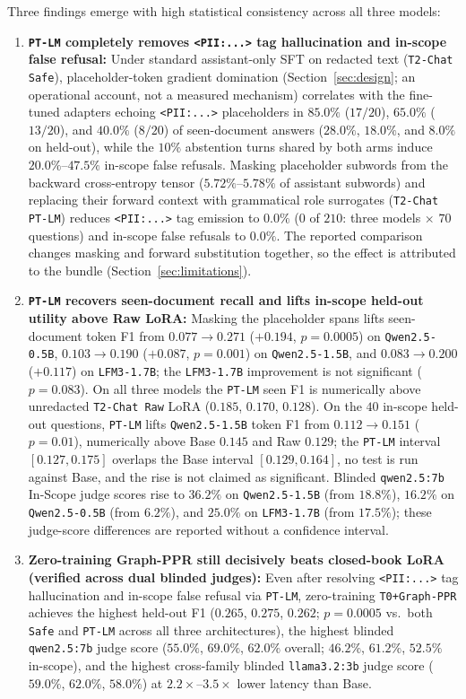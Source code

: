 \documentclass{article}
\begin{document}
Three findings emerge with high statistical consistency across all three models:
\begin{enumerate}
    \item \textbf{\texttt{PT-LM} completely removes \texttt{<PII:...>} tag hallucination and in-scope false refusal:} Under standard assistant-only SFT on redacted text (\texttt{T2-Chat Safe}), placeholder-token gradient domination (Section~\ref{sec:design}; an operational account, not a measured mechanism) correlates with the fine-tuned adapters echoing \texttt{<PII:...>} placeholders in $85.0\%$ ($17/20$), $65.0\%$ ($13/20$), and $40.0\%$ ($8/20$) of seen-document answers ($28.0\%$, $18.0\%$, and $8.0\%$ on held-out), while the $10\%$ abstention turns shared by both arms induce $20.0\%$--$47.5\%$ in-scope false refusals. Masking placeholder subwords from the backward cross-entropy tensor ($5.72\%$--$5.78\%$ of assistant subwords) and replacing their forward context with grammatical role surrogates (\texttt{T2-Chat PT-LM}) reduces \texttt{<PII:...>} tag emission to $\mathbf{0.0\%}$ ($0$ of $210$: three models $\times$ $70$ questions) and in-scope false refusals to $\mathbf{0.0\%}$. The reported comparison changes masking and forward substitution together, so the effect is attributed to the bundle (Section~\ref{sec:limitations}).
    \item \textbf{\texttt{PT-LM} recovers seen-document recall and lifts in-scope held-out utility above Raw LoRA:} Masking the placeholder spans lifts seen-document token F1 from $0.077 \to \mathbf{0.271}$ ($+0.194$, $p = 0.0005$) on \texttt{Qwen2.5-0.5B}, $0.103 \to \mathbf{0.190}$ ($+0.087$, $p = 0.001$) on \texttt{Qwen2.5-1.5B}, and $0.083 \to \mathbf{0.200}$ ($+0.117$) on \texttt{LFM3-1.7B}; the \texttt{LFM3-1.7B} improvement is not significant ($p = 0.083$). On all three models the \texttt{PT-LM} seen F1 is numerically above unredacted \texttt{T2-Chat Raw} LoRA ($0.185$, $0.170$, $0.128$). On the $40$ in-scope held-out questions, \texttt{PT-LM} lifts \texttt{Qwen2.5-1.5B} token F1 from $0.112 \to 0.151$ ($p = 0.01$), numerically above Base $0.145$ and Raw $0.129$; the \texttt{PT-LM} interval $[0.127, 0.175]$ overlaps the Base interval $[0.129, 0.164]$, no test is run against Base, and the rise is not claimed as significant. Blinded \texttt{qwen2.5:7b} In-Scope judge scores rise to $36.2\%$ on \texttt{Qwen2.5-1.5B} (from $18.8\%$), $16.2\%$ on \texttt{Qwen2.5-0.5B} (from $6.2\%$), and $25.0\%$ on \texttt{LFM3-1.7B} (from $17.5\%$); these judge-score differences are reported without a confidence interval.
    \item \textbf{Zero-training Graph-PPR still decisively beats closed-book LoRA (verified across dual blinded judges):} Even after resolving \texttt{<PII:...>} tag hallucination and in-scope false refusal via \texttt{PT-LM}, zero-training \texttt{T0+Graph-PPR} achieves the highest held-out F1 ($0.265$, $0.275$, $0.262$; $p = 0.0005$ vs.\ both \texttt{Safe} and \texttt{PT-LM} across all three architectures), the highest blinded \texttt{qwen2.5:7b} judge score ($55.0\%$, $69.0\%$, $62.0\%$ overall; $46.2\%$, $61.2\%$, $52.5\%$ in-scope), and the highest cross-family blinded \texttt{llama3.2:3b} judge score ($59.0\%$, $62.0\%$, $58.0\%$) at $2.2\times$--$3.5\times$ lower latency than Base.

\end{enumerate}
\end{document}
